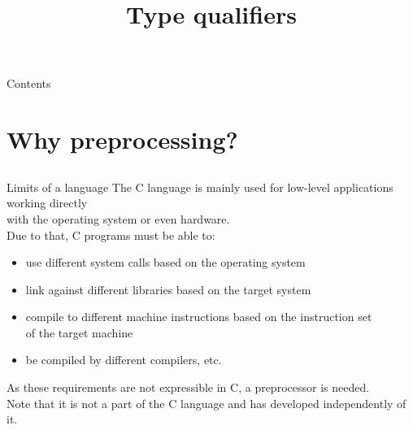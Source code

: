 
\newcommand{\topic}{
	Type qualifiers
}

\title{\topic}
\supertitle{\course}
\date{}



\maketitle

\begin{frame}{Contents}
	\tableofcontents
\end{frame}

\section{Why preprocessing?}
\subsection{}

\begin{frame}{Limits of a language}
	The C language is mainly used for low-level applications working directly\\
	with the operating system or even hardware.\\
	\bigskip
	Due to that, C programs must be able to:
	\begin{itemize}
		\item use different system calls based on the operating system
		\item link against different libraries based on the target system
		\item compile to different machine instructions based on the instruction set\\
			  of the target machine
		\item be compiled by different compilers, etc.
	\end{itemize}
	\bigskip
	As these requirements are not expressible in C, a preprocessor is needed.\\
	Note that it is not a part of the C language and has developed independently of it.
\end{frame}

